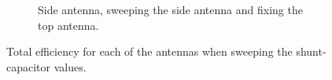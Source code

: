 \begin{figure}[htbp]
\begin{subfigure}{0.49\linewidth}
        \caption{Side antenna, sweeping the side antenna and fixing the top antenna.}
    \end{subfigure}
    \caption{Total efficiency for each of the antennas when sweeping the shunt-capacitor values.}
    \label{fig:triang_proto_sweep_efficiency}
\end{figure}
